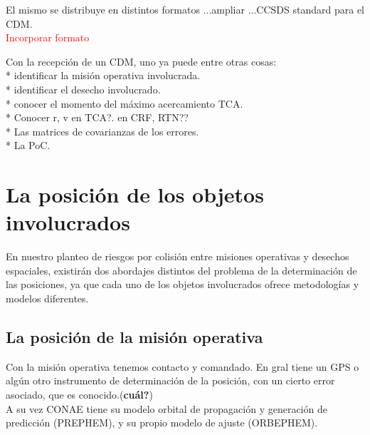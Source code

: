 El mismo se distribuye en distintos formatos ...ampliar ...CCSDS standard para el CDM. \\
\textcolor{red}{Incorporar formato}

Con la recepci\'on de un CDM, uno ya puede entre otras cosas:\\
* identificar la misi\'on operativa involucrada.\\
* identificar el desecho involucrado.\\
* conocer el momento del m\'aximo acercamiento TCA.\\
* Conocer r, v en TCA?. en CRF, RTN??\\
* Las matrices de covarianzas de los errores.\\
* La PoC.\\

\section{La posici\'on de los objetos involucrados}{\label{sec:posMision}}

En nuestro planteo de riesgos por colisi\'on entre misiones operativas y desechos espaciales, existir\'an dos abordajes distintos del problema de la determinaci\'on de las posiciones, ya que cada uno de los objetos involucrados ofrece metodolog\'ias y modelos diferentes.

\subsection*{La posici\'on de la misi\'on operativa}
Con la misi\'on operativa tenemos contacto y comandado. En gral tiene un GPS o alg\'un otro instrumento de determinaci\'on de la posici\'on, con un cierto error asociado, que es conocido.({\bf{cu\'al?}})\\
A su vez CONAE tiene su modelo orbital de propagaci\'on y generaci\'on de predicci\'on (PREPHEM), y su propio modelo de ajuste (ORBEPHEM).\\

